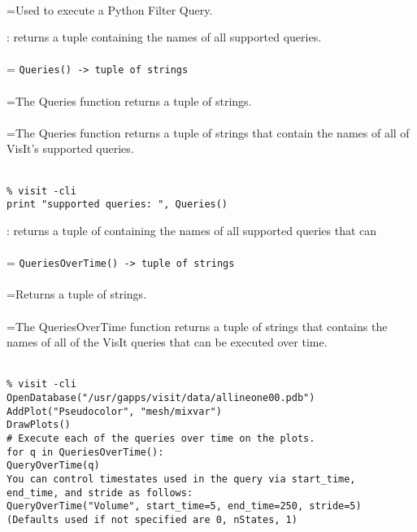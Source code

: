 \documentclass[10pt,a4paper]{report}
\begin{document}
 \\ 
\hangindent=\parindent Used to execute a Python Filter Query. \\[-3mm] 

\newpage


{}
: returns a tuple containing the names of all supported queries.\\[-3mm]

 \\ 
\hangindent=\parindent 
\verb!Queries() -> tuple of strings!\\ [-3mm]

 \\ 
\hangindent=\parindent The Queries function returns a tuple of strings. \\[-3mm] 

 \\ 
\hangindent=\parindent The Queries function returns a tuple of strings that contain the names of all of VisIt's supported queries. \\[-3mm] 

\\[-6mm]
\begin{verbatim}% visit -cli
print "supported queries: ", Queries()
\end{verbatim}
\newpage


{}
: returns a tuple of containing the names of all supported queries that can\\[-3mm]

 \\ 
\hangindent=\parindent 
\verb!QueriesOverTime() -> tuple of strings!\\ [-3mm]

 \\ 
\hangindent=\parindent Returns a tuple of strings. \\[-3mm] 

 \\ 
\hangindent=\parindent The QueriesOverTime function returns a tuple of strings that contains the names of all of the VisIt queries that can be executed over time. \\[-3mm] 

\\[-6mm]
\begin{verbatim}% visit -cli
OpenDatabase("/usr/gapps/visit/data/allineone00.pdb")
AddPlot("Pseudocolor", "mesh/mixvar")
DrawPlots()
# Execute each of the queries over time on the plots.
for q in QueriesOverTime():
QueryOverTime(q)
You can control timestates used in the query via start_time,
end_time, and stride as follows:
QueryOverTime("Volume", start_time=5, end_time=250, stride=5)
(Defaults used if not specified are 0, nStates, 1)
\end{verbatim}
\newpage
\end{document}
